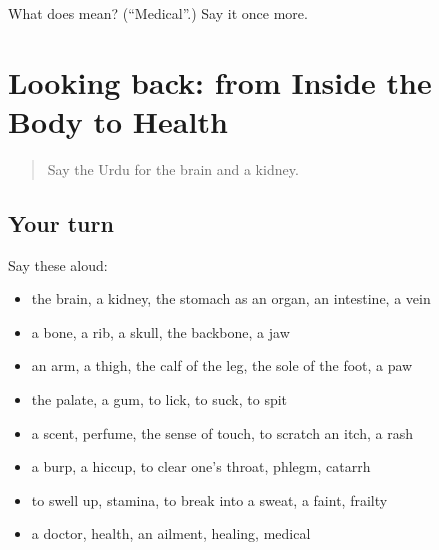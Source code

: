 \begin{tcolorbox}[breakable,colback=teal!4,colframe=teal!35!black,title={Before you move on}]
What does  mean? (\textquotedblleft{}Medical\textquotedblright{}.) Say it once more.
\end{tcolorbox}
\section[(dialogue)]{Looking back: from Inside the Body to Health}

\label{lesson:UR-R471-review-464-471}



\begin{quote}
Say the Urdu for the brain and a kidney.
\end{quote}

\subsection*{Your turn}
Say these aloud:

\begin{itemize}
\raggedright
  \item the brain, a kidney, the stomach as an organ, an intestine, a vein
  \item a bone, a rib, a skull, the backbone, a jaw
  \item an arm, a thigh, the calf of the leg, the sole of the foot, a paw
  \item the palate, a gum, to lick, to suck, to spit
  \item a scent, perfume, the sense of touch, to scratch an itch, a rash
  \item a burp, a hiccup, to clear one's throat, phlegm, catarrh
  \item to swell up, stamina, to break into a sweat, a faint, frailty
  \item a doctor, health, an ailment, healing, medical
\end{itemize}

